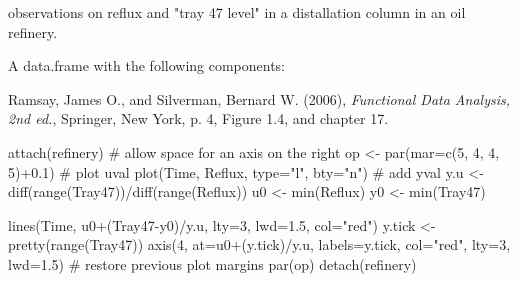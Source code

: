 \begin{Description} observations on reflux and "tray 47 level" in a distallation
column in an oil refinery.
\end{Description}
\begin{Format}\relax
A data.frame with the following components:  
\end{Format}
\begin{Source}\relax
Ramsay, James O., and Silverman, Bernard W. (2006), \emph{Functional
Data Analysis, 2nd ed.}, Springer, New York, p. 4, Figure 1.4, and
chapter 17.
\end{Source}
\begin{Examples}
\begin{ExampleCode}
    attach(refinery)
# allow space for an axis on the right 
    op <- par(mar=c(5, 4, 4, 5)+0.1)
# plot uval 
    plot(Time, Reflux, type="l", bty="n")
# add yval 
    y.u <- diff(range(Tray47))/diff(range(Reflux))
    u0 <- min(Reflux)
    y0 <- min(Tray47)

    lines(Time, u0+(Tray47-y0)/y.u, lty=3, lwd=1.5, col="red")
    y.tick <- pretty(range(Tray47))
    axis(4, at=u0+(y.tick)/y.u, labels=y.tick, col="red", lty=3,
            lwd=1.5)
# restore previous plot margins
    par(op)
    detach(refinery)
\end{ExampleCode}
\end{Examples}

